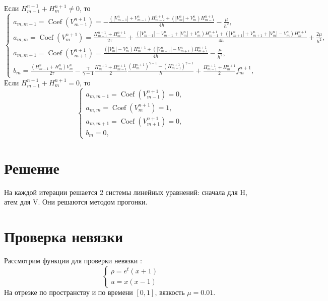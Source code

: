 \documentclass[12pt]{article}
\DeclareMathOperator{\Coef}{Coef}
\begin{document}
Если $ H_{m-1}^{n+1} + H_{m}^{n+1} \ne 0$, то
\begin{equation}
\begin{cases}
a_{m,m-1} = \Coef (V_{m-1}^{n+1}) = - \frac {(|V_{m-1}^n|+V_{m-1}^n)H_{m-2}^{n+1} + (|V_{m}^n| +V_m^n)H_{m-1}^{n+1}}{4h} - \frac {\mu} {h^2},\\
a_{m,m} = \Coef (V_{m}^{n+1}) = \frac{H_{m-1}^{n+1} + H_m^{n+1}}{2\tau} + \frac{(|V_{m-1}^n| - V_{m-1}^n +|V_m^n| + V_m^n)H_{m-1}^{n+1} + (|V_{m+1}^n| + V_{m+1}^n + |V_m^n| - V_m^n)H_m^{n+1}}{4h} + \frac {2\mu}{h^2},\\
a_{m,m+1} = \Coef (V_{m+1}^{n+1}) = \frac {(|V_m^n| - V_m^n)H_m^{n+1} + (|V_{m+1}^n| - V_{m+1}^n)H_{m+1}^{n+1}} {4h} - \frac {\mu} {h^2},\\
b_m = \frac{(H_{m-1}^n + H_m^n)V_m^n}{2\tau} - \frac{\gamma}{\gamma - 1} \frac {H_m^{n+1} + H_{m-1}^{n+1}}{2} \frac {(H_m^{n+1})^{\gamma - 1} - (H_{m-1}^{n+1})^{\gamma - 1}}{h} + \frac {H_{m-1}^{n+1} + H_m^{n+1}}{2}f_m^{n+1}, 
\end{cases}
\end{equation}
Если $ H_{m-1}^{n+1} + H_{m}^{n+1} = 0$, то
\begin{equation}
\begin{cases}
a_{m,m-1} = \Coef (V_{m-1}^{n+1}) = 0,\\
a_{m,m} = \Coef (V_{m}^{n+1}) = 1,\\
a_{m,m+1} = \Coef (V_{m+1}^{n+1}) = 0,\\
b_m = 0, 
\end{cases}
\end{equation}

\section{Решение}
На каждой итерации решается 2 системы линейных уравнений: сначала для H, атем для V.
Они решаются методом прогонки.

\section{Проверка невязки}
Рассмотрим функции для проверки невязки :
\begin{equation}
\begin{cases}
\rho = e^t (x+1)
\\
u = x (x - 1)
\end{cases}
\end{equation}
На отрезке по пространству и по времени $[0,1]$, вязкость $\mu = 0.01$.
\end{document}
